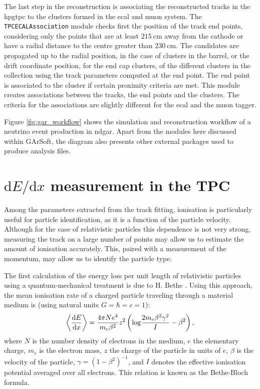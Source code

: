 The last step in the reconstruction is associating the reconstructed tracks in the \gls{hpgtpc} to the clusters formed in the \gls{ecal} and muon system. The \texttt{TPCECALAssociation} module checks first the position of the track end points, considering only the points that are at least $215~\mathrm{cm}$ away from the cathode or have a radial distance to the centre greater than $230~\mathrm{cm}$. The candidates are propagated up to the radial position, in the case of clusters in the barrel, or the drift coordinate position, for the end cap clusters, of the different clusters in the collection using the track parameters computed at the end point. The end point is associated to the cluster if certain proximity criteria are met. This module creates associations between the tracks, the end points and the clusters. The criteria for the associations are slightly different for the \gls{ecal} and the muon tagger.

Figure \ref{fig:gar_workflow} shows the simulation and reconstruction workflow of a neutrino event production in \gls{ndgar}. Apart from the modules here discussed within GArSoft, the diagram also presents other external packages used to produce analysis files.

\section[\texorpdfstring{$\mathrm{d}E/\mathrm{d}x$}{dE/dx} measurement in the TPC]{\boldmath\texorpdfstring{$\mathrm{d}E/\mathrm{d}x$}{dE/dx} measurement in the TPC}\label{section:dEdx}

Among the parameters extracted from the track fitting, ionisation is particularly useful for particle identification, as it is a function of the particle velocity. Although for the case of relativistic particles this dependence is not very strong, measuring the track on a large number of points may allow us to estimate the amount of ionisation accurately. This, paired with a measurement of the momentum, may allow us to identify the particle type.

The first calculation of the energy loss per unit length of relativistic particles using a quantum-mechanical treatment is due to H. Bethe \cite{Bethe1930}. Using this approach, the mean ionisation rate of a charged particle traveling through a material medium is (using natural units $G=\hbar=c=1$):
\begin{equation}\label{Eq:3.1}
    \expval{\frac{\mathrm{d}E}{\mathrm{d}x}} = \frac{4 \pi N e^{4}}{m_{e}\beta^{2}} z^{2} \left(\mathrm{log} \frac{2m_{e}\beta^{2}\gamma^{2}}{I} - \beta^{2}\right),
\end{equation}
where $N$ is the number density of electrons in the medium, $e$ the elementary charge, $m_{e}$ is the electron mass, $z$ the charge of the particle in units of $e$, $\beta$ is the velocity of the particle, $\gamma = (1-\beta^{2})^{-1}$, and $I$ denotes the effective ionisation potential averaged over all electrons. This relation is known as the Bethe-Bloch formula.


